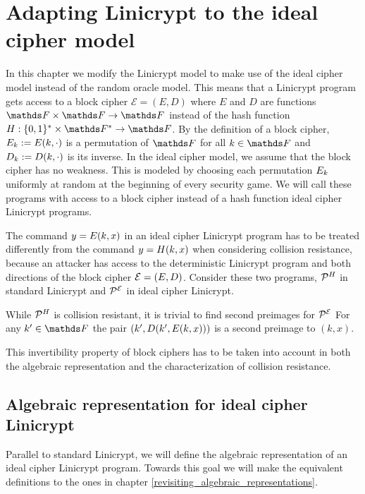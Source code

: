 \chapter{Adapting Linicrypt to the ideal cipher model}

In this chapter we modify the Linicrypt model to make use of the ideal cipher model instead of the random oracle model.
This means that a Linicrypt program gets access to a block cipher $\mathcal{E} = (E, D)$ where $E$ and $D$ are functions $\F \times \F \to \F$
instead of the hash function $\H : \{0,1\}^* \times \F^* \to \F$.
By the definition of a block cipher,
$E_k := E(k, \cdot)$ is a permutation of $\F$ for all $k \in \F$ and
$D_k := D(k, \cdot)$ is its inverse.
In the ideal cipher model, we assume that the block cipher has no weakness.
This is modeled by choosing each permutation $E_k$ uniformly at random at the beginning of every security game.
We will call these programs with access to a block cipher instead of a hash function ideal cipher Linicrypt programs.

The command $y = E(k, x)$ in an ideal cipher Linicrypt program has to be treated differently from the command $y = H(k, x)$ when considering collision resistance,
because an attacker has access to the deterministic Linicrypt program and both directions of the block cipher $\mathcal{E} = (E, D)$.
Consider these two programs, $\mathcal{P}^H_{\textit{}}$ in standard Linicrypt and $\mathcal{P}^{\mathcal{E}}_{\textit{}}$ in ideal cipher Linicrypt.

\begin{pchstack}[center,space=2cm]
\end{pchstack}
While $\mathcal{P}^H_{\textit{}}$ is collision resistant, it is trivial to find second preimages for $\mathcal{P}^{\mathcal{E}}_{\textit{}}$
For any $k' \in \F$ the pair $(k', D(k', E(k, x)))$ is a second preimage to $(k,x)$.

This invertibility property of block ciphers has to be taken into account
in both the algebraic representation and the characterization of collision resistance.

\section{Algebraic representation for ideal cipher Linicrypt}

Parallel to standard Linicrypt, we will define the algebraic representation of an ideal cipher Linicrypt program.
Towards this goal we will make the equivalent definitions to the ones in chapter \ref{revisiting_algebraic_representations}.

